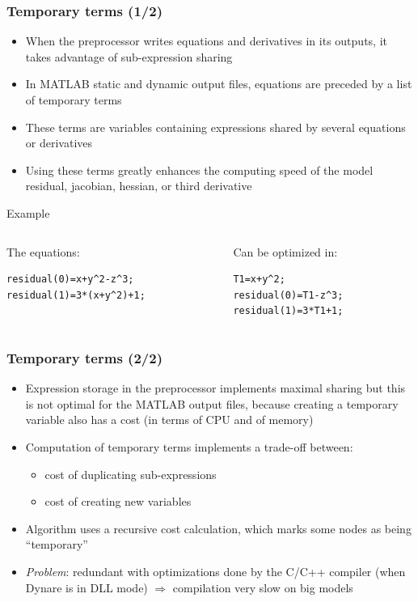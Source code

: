 \documentclass{beamer}
\begin{document}
\begin{frame}[fragile]
  \frametitle{Temporary terms (1/2)}
  \begin{itemize}
  \item When the preprocessor writes equations and derivatives in its outputs, it takes advantage of sub-expression sharing
  \item In MATLAB static and dynamic output files, equations are preceded by a list of \alert{temporary terms}
  \item These terms are variables containing expressions shared by several equations or derivatives
  \item Using these terms greatly enhances the computing speed of the model residual, jacobian, hessian, or third derivative
  \end{itemize}
  \begin{block}{Example}
    \begin{columns}[t]
      \begin{column}{6cm}
        The equations:
\begin{verbatim}
residual(0)=x+y^2-z^3;
residual(1)=3*(x+y^2)+1;
\end{verbatim}
      \end{column}
      \begin{column}{4.8cm}
        Can be optimized in:
\begin{verbatim}
T1=x+y^2;
residual(0)=T1-z^3;
residual(1)=3*T1+1;
\end{verbatim}
      \end{column}
    \end{columns}
  \end{block}
\end{frame}

\begin{frame}
  \frametitle{Temporary terms (2/2)}
  \begin{itemize}
  \item Expression storage in the preprocessor implements maximal sharing but this is not optimal for the MATLAB output files, because creating a temporary variable also has a cost (in terms of CPU and of memory)
  \item Computation of temporary terms implements a trade-off between:
    \begin{itemize}
    \item cost of duplicating sub-expressions
    \item cost of creating new variables
    \end{itemize}
  \item Algorithm uses a recursive cost calculation, which marks some nodes as being ``temporary''
  \item \textit{Problem}: redundant with optimizations done by the C/C++ compiler (when Dynare is in DLL mode) $\Rightarrow$ compilation very slow on big models
  \end{itemize}
\end{frame}
\end{document}
